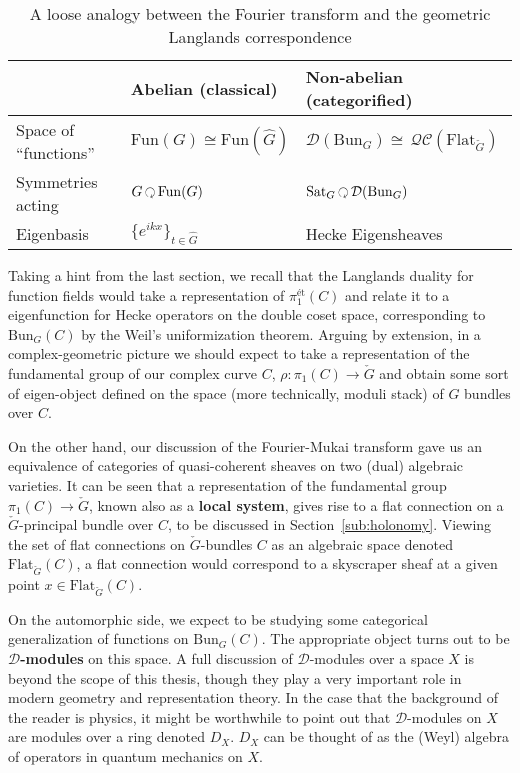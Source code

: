  
\begin{table}[h!]
	\centering
\begin{tabularx}{\textwidth}{|>{\hsize}Y|Y|>{\hsize}Y|}
	\hline
	& Abelian (classical) & Non-abelian (categorified)\\
	\hline
	Space of ``functions'' & $\mathrm{Fun}(G) \cong \mathrm{Fun}(\hat G)$ & $\mathcal D (\mathrm{Bun}_G) \cong \, \mathcal{QC}(\mathrm{Flat}_{\check G})$\\
	Symmetries acting & $G \lacts \mathrm{Fun}(G)$ & $\mathrm{Sat}_G \lacts \mathcal D (\mathrm{Bun}_G)$\\
	Eigenbasis & $\{e^{ikx}\}_{t \in \hat G}$ & Hecke Eigensheaves\\
	\hline
	\end{tabularx}
\caption{A loose analogy between the Fourier transform and the geometric Langlands correspondence}
\label{tab:geometric_langlands}
\end{table}


Taking a hint from the last section, we recall that the Langlands duality for function fields would take a representation of $\pi_1^{\text{\'et}}(C)$ and relate it to a eigenfunction for Hecke operators on the double coset space, corresponding to $\mathrm{Bun}_G(C)$ by the Weil's uniformization theorem. 
Arguing by extension, in a complex-geometric picture we should expect to take a representation of the fundamental group of our complex curve $C$, $\rho: \pi_1(C) \to \check G$ and obtain some sort of eigen-object defined on the space (more technically, moduli stack) of $G$ bundles over $C$. 

On the other hand, our discussion of the Fourier-Mukai transform gave us an equivalence of categories of quasi-coherent sheaves on two (dual) algebraic varieties. It can be seen that a representation of the fundamental group $\pi_1 (C) \to \check G$, known also as a \textbf{local system}, gives rise to a flat connection on a $\check G$-principal bundle over $C$, to be discussed in Section~\ref{sub:holonomy}. Viewing the set of flat connections on $\check G$-bundles $C$ as an algebraic space denoted $\mathrm{Flat}_{\check G} (C)$, a flat connection would correspond to a skyscraper sheaf at a given point $x \in \mathrm{Flat}_{\check G} (C)$. 

On the automorphic side, we expect to be studying some categorical generalization of functions on $\mathrm{Bun}_G(C)$. The appropriate object turns out to be \textbf{$\mathcal D$-modules} on this space.
A full discussion of $\mathcal D$-modules over a space $X$ is beyond the scope of this thesis, though they play a very important role in modern geometry and representation theory. In the case that the background of the reader is physics, it might be worthwhile to point out that $\mathcal D$-modules on $X$ are modules over a ring denoted $D_X$. $D_X$ can be thought of as the (Weyl) algebra of operators in quantum mechanics on $X$.

